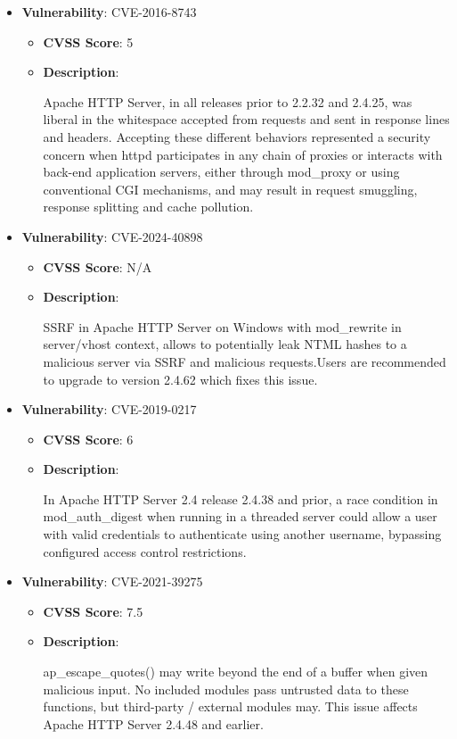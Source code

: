 \documentclass{article}
\begin{document}
\begin{itemize}
        \item \textbf{Vulnerability}: CVE-2016-8743
        \begin{itemize}
            \item \textbf{CVSS Score}:  5 
            \item \textbf{Description}:
            \parbox[t]{0.9\linewidth}{
                \ttfamily Apache HTTP Server, in all releases prior to 2.2.32 and 2.4.25, was liberal in the whitespace accepted from requests and sent in response lines and headers. Accepting these different behaviors represented a security concern when httpd participates in any chain of proxies or interacts with back-end application servers, either through mod\_proxy or using conventional CGI mechanisms, and may result in request smuggling, response splitting and cache pollution.
            }
        \end{itemize}
    
        \item \textbf{Vulnerability}: CVE-2024-40898
        \begin{itemize}
            \item \textbf{CVSS Score}:  N/A 
            \item \textbf{Description}:
            \parbox[t]{0.9\linewidth}{
                \ttfamily SSRF in Apache HTTP Server on Windows with mod\_rewrite in server/vhost context, allows to potentially leak NTML hashes to a malicious server via SSRF and malicious requests.Users are recommended to upgrade to version 2.4.62 which fixes this issue.
            }
        \end{itemize}
    
        \item \textbf{Vulnerability}: CVE-2019-0217
        \begin{itemize}
            \item \textbf{CVSS Score}:  6 
            \item \textbf{Description}:
            \parbox[t]{0.9\linewidth}{
                \ttfamily In Apache HTTP Server 2.4 release 2.4.38 and prior, a race condition in mod\_auth\_digest when running in a threaded server could allow a user with valid credentials to authenticate using another username, bypassing configured access control restrictions.
            }
        \end{itemize}
    
        \item \textbf{Vulnerability}: CVE-2021-39275
        \begin{itemize}
            \item \textbf{CVSS Score}:  7.5 
            \item \textbf{Description}:
            \parbox[t]{0.9\linewidth}{
                \ttfamily ap\_escape\_quotes() may write beyond the end of a buffer when given malicious input. No included modules pass untrusted data to these functions, but third-party / external modules may. This issue affects Apache HTTP Server 2.4.48 and earlier.
            }
        \end{itemize}
    

\end{itemize}
\end{document}
